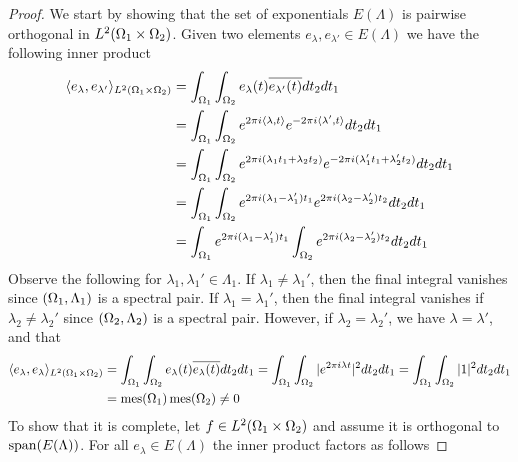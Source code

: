 \documentclass[../thesis.tex]{subfiles}
\begin{document}
\begin{proof}
    We start by showing that the set of exponentials $E(\Lambda)$
    is pairwise orthogonal in $L^2(\Omega_1 \times \Omega_2)$. Given two elements $e_\lambda,e_{\lambda'} \in E(\Lambda)$ we have the following inner product %
    \begin{align*}
        \langle e_\lambda,e_{\lambda'}\rangle_{L^2(\Omega_1 \times \Omega_2)} 
        &= \int_{\Omega_1} \int_{\Omega_2} e_{\lambda}(t) \overline{e_{\lambda'}(t)} dt_2 dt_1\\ 
        &= \int_{\Omega_1} \int_{\Omega_2} e^{2\pi i \langle\lambda, t\rangle } e^{-2\pi i  \langle\lambda', t\rangle} dt_2 dt_1\\ 
        &= \int_{\Omega_1} \int_{\Omega_2} e^{2\pi i (\lambda_1 t_1+\lambda_2 t_2)} e^{-2\pi i(\lambda_1' t_1+\lambda_2' t_2)} dt_2 dt_1\\ 
        &= \int_{\Omega_1} \int_{\Omega_2} e^{2\pi i (\lambda_1- \lambda_1')t_1} e^{2\pi i (\lambda_2 - \lambda_2')t_2} dt_2 dt_1\\ 
        &= \int_{\Omega_1} e^{2\pi i  (\lambda_1- \lambda_1')t_1} \int_{\Omega_2}  e^{2\pi i (\lambda_2 - \lambda_2')t_2} dt_2 dt_1
    \end{align*}
    Observe the following for $\lambda_1, \lambda_1' \in \Lambda_1$. If $\lambda_1 \neq \lambda_1'$, then the final integral vanishes since $(\Omega_1, \Lambda_1)$ is a spectral pair. If $\lambda_1 = \lambda_1'$, then the final integral vanishes if $\lambda_2 \neq \lambda_2'$ since $(\Omega_2, \Lambda_2)$ is a spectral pair. However, if $\lambda_2 = \lambda_2'$, we have $\lambda = \lambda'$, and that 
    \begin{align*}
        \langle e_\lambda, e_\lambda\rangle_{L^2(\Omega_1 \times \Omega_2)}
        &= \int_{\Omega_1} \int_{\Omega_2} e_{\lambda}(t) \overline{e_{\lambda}(t)} dt_2 dt_1
        =\int_{\Omega_1} \int_{\Omega_2} |e^{2 \pi i \lambda t}|^2 dt_2 dt_1
        = \int_{\Omega_1} \int_{\Omega_2} |1|^2 dt_2 dt_1\\
        &= \operatorname{mes}(\Omega_1)\operatorname{mes}(\Omega_2) \neq 0
    \end{align*}
    To show that it is complete, let $f\in L^2(\Omega_1 \times \Omega_2)$ and assume it is orthogonal to $\operatorname{span}(E(\Lambda))$. For all $e_\lambda \in E(\Lambda)$ the inner product factors as follows

\end{proof}
\end{document}
